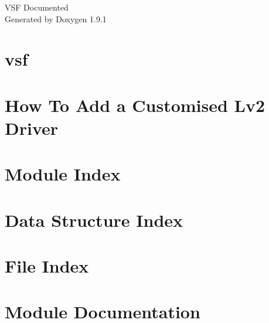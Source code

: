 \let\mypdfximage\pdfximage\def\pdfximage{\immediate\mypdfximage}\documentclass[twoside]{book}
\newcommand{\+}{\discretionary{\mbox{\scriptsize$\hookleftarrow$}}{}{}}
\newcommand{\clearemptydoublepage}{%
  \newpage{\pagestyle{empty}\cleardoublepage}%
}
\begin{document}
\raggedbottom

\hypersetup{pageanchor=false,
             bookmarksnumbered=true,
             pdfencoding=unicode
            }
\begin{titlepage}
\vspace*{7cm}
\begin{center}%
{\Large VSF Documented }\\
\vspace*{1cm}
{\large Generated by Doxygen 1.9.1}\\
\end{center}
\end{titlepage}
\clearemptydoublepage
{}
\tableofcontents
\clearemptydoublepage
{}
\hypersetup{pageanchor=true}

\chapter{vsf}
\label{index}\hypertarget{index}{}
\chapter{How To Add a Customised Lv2 Driver}
\label{md_source_osa_hal_driver_customised_readme}

\chapter{Module Index}

\chapter{Data Structure Index}

\chapter{File Index}

\chapter{Module Documentation}



\end{document}
